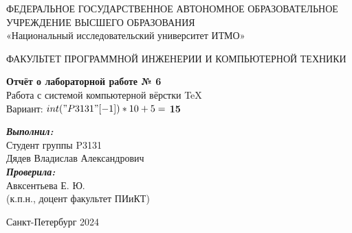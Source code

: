 \thispagestyle{empty}
\begin{center}

    ФЕДЕРАЛЬНОЕ ГОСУДАРСТВЕННОЕ АВТОНОМНОЕ ОБРАЗОВАТЕЛЬНОЕ УЧРЕЖДЕНИЕ ВЫСШЕГО ОБРАЗОВАНИЯ\\
    «Национальный исследовательский университет ИТМО»

    \vspace{4em}
    ФАКУЛЬТЕТ ПРОГРАММНОЙ ИНЖЕНЕРИИ И КОМПЬЮТЕРНОЙ ТЕХНИКИ

    \vspace{16em}
    
    {\Large \textbf{Отчёт о лабораторной работе № 6}}\\[1em]
    {Работа с системой компьютерной вёрстки \TeX}\\[1em]
    Вариант: $int("P3131"[-1]) * 10 + 5 =$ \textbf{15}
\end{center}

\vspace{15em}

\begin{flushright}
    \textbf{\textit{Выполнил:}} \\
    Студент группы P3131 \\
    Дядев Владислав Александрович\\
    \textbf{\textit{Проверила:}} \\
    Авксентьева Е. Ю. \\
    (к.п.н., доцент факультет ПИиКТ)
\end{flushright}
\vspace{6em}

\begin{center}
Санкт-Петербург 2024
\end{center}